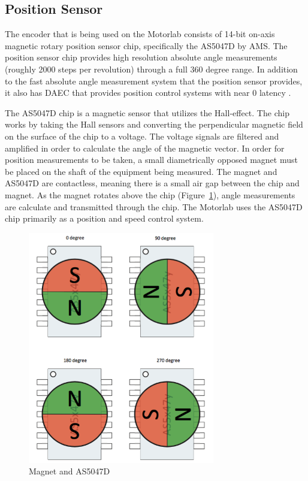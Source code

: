 \subsection{Position Sensor}
\label{makereference2.1.2} 


The encoder that is being used on the Motorlab consists of 14-bit on-axis magnetic rotary position sensor chip, specifically the AS5047D by AMS. The position sensor chip provides high resolution absolute angle measurements (roughly 2000 steps per revolution) through a full 360 degree range. In addition to the fast absolute angle measurement system that the position sensor provides, it also has \ac{DAEC} that provides position control systems with near 0 latency \citep{1}.  

The AS5047D chip is a magnetic sensor that utilizes the Hall-effect. The chip works by taking the Hall sensors and converting the perpendicular magnetic field on the surface of the chip to a voltage. The voltage signals are filtered and amplified in order to calculate the angle of the magnetic vector. In order for position measurements to be taken, a small diametrically opposed magnet must be placed on the shaft of the equipment being measured. The magnet and AS5047D are contactless, meaning there is a small air gap between the chip and magnet. As the magnet rotates above the chip (Figure~\ref{magnet_rotation}), angle measurements are calculate and transmitted through the chip. The Motorlab uses the AS5047D chip primarily as a position and speed control system. 

\begin{figure}[htb]%
\begin{center}
    \includegraphics[height=4in]{figures/magnetic_field.png}

    \caption[Magnet and AS5047D]{Magnet and AS5047D}

    \label{magnet_rotation}
\end{center}
\end{figure}

